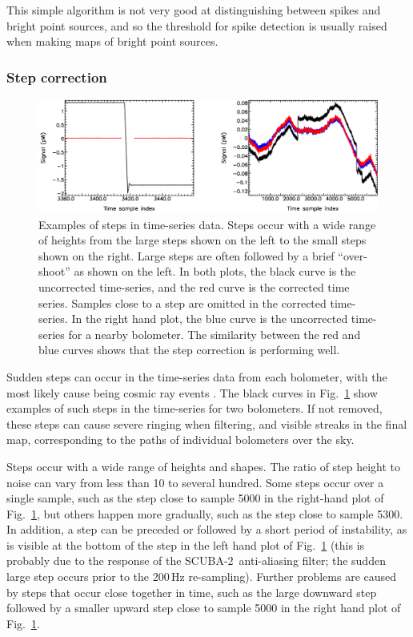 \documentclass[useAMS,usenatbib,nofootinbib]{mn2e}
\newcommand{\scuba}{SCUBA-2}
\begin{document}
This simple algorithm is not very good at distinguishing between spikes
and bright point sources, and so the threshold for spike detection is
usually raised when making maps of bright point sources.

\subsubsection{Step correction}
\label{sec:steps}

\begin{figure}
\centering
\includegraphics[width=\linewidth]{steps1}
\caption{Examples of steps in time-series data. Steps occur with a wide
range of heights from the large steps shown on the left to the small
steps shown on the right. Large steps are often followed by a brief
``over-shoot'' as shown on the left. In both plots, the black curve is
the uncorrected time-series, and the red curve is the corrected time
series. Samples close to a step are omitted in the corrected time-series.
In the right hand plot, the blue curve is the uncorrected time-series for
a nearby bolometer. The similarity between the red and blue curves shows
that the step correction is performing well.
}
\label{fig:steps1}
\end{figure}

Sudden steps can occur in the time-series data from each bolometer,
with the most likely cause being cosmic ray events \citep[see
Section~3.5.3 in][]{holland2012}. The black curves in
Fig.~\ref{fig:steps1} show examples of such steps in the time-series
for two bolometers. If not removed, these steps can cause severe
ringing when filtering, and visible streaks in the final map,
corresponding to the paths of individual bolometers over the sky.

Steps occur with a wide range of heights and shapes. The ratio of step
height to noise can vary from less than 10 to several hundred. Some
steps occur over a single sample, such as the step close to sample
5000 in the right-hand plot of Fig.~\ref{fig:steps1}, but others
happen more gradually, such as the step close to sample 5300. In
addition, a step can be preceded or followed by a short period of
instability, as is visible at the bottom of the step in the left hand
plot of Fig.~\ref{fig:steps1} (this is probably due to the response of
the \scuba\ anti-aliasing filter; the sudden large step occurs prior
to the 200\,Hz re-sampling). Further problems are caused by steps that
occur close together in time, such as the large downward step followed
by a smaller upward step close to sample 5000 in the right hand plot
of Fig.~\ref{fig:steps1}.
\end{document}
